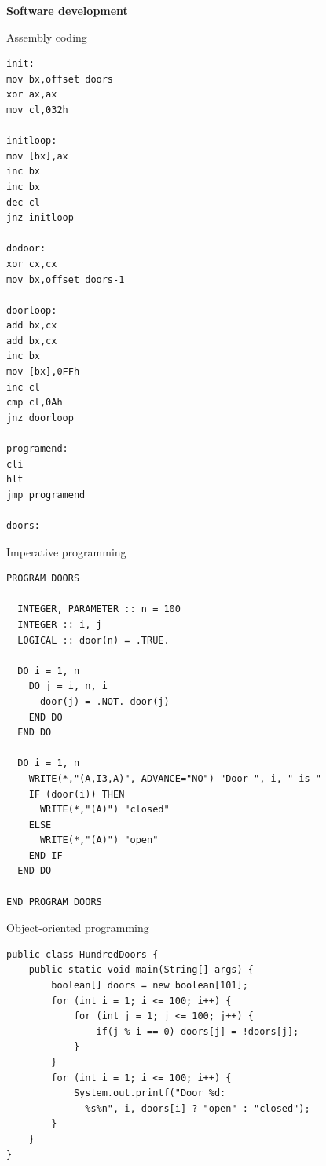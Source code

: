 \documentclass[dvips,slidetop,mathserif,red]{beamer}
\begin{document}
\begin{frame}{}
  \begin{center}
    \begin{Huge}
      \textbf{Software development}
    \end{Huge}
  \end{center}
\end{frame}

\begin{frame}[containsverbatim]{Assembly coding}
  \begin{tiny}
    \begin{verbatim}
init:
mov bx,offset doors
xor ax,ax
mov cl,032h

initloop:
mov [bx],ax
inc bx
inc bx
dec cl
jnz initloop

dodoor:
xor cx,cx
mov bx,offset doors-1

doorloop:
add bx,cx
add bx,cx
inc bx
mov [bx],0FFh
inc cl
cmp cl,0Ah
jnz doorloop

programend:
cli
hlt
jmp programend

doors:
    \end{verbatim}
  \end{tiny}
\end{frame}

\begin{frame}[containsverbatim]{Imperative programming}
  \begin{footnotesize}
    \begin{verbatim}
PROGRAM DOORS

  INTEGER, PARAMETER :: n = 100
  INTEGER :: i, j
  LOGICAL :: door(n) = .TRUE.

  DO i = 1, n
    DO j = i, n, i
      door(j) = .NOT. door(j)
    END DO
  END DO

  DO i = 1, n
    WRITE(*,"(A,I3,A)", ADVANCE="NO") "Door ", i, " is "
    IF (door(i)) THEN
      WRITE(*,"(A)") "closed"
    ELSE
      WRITE(*,"(A)") "open"
    END IF
  END DO

END PROGRAM DOORS
    \end{verbatim}
  \end{footnotesize}
\end{frame}

\begin{frame}[containsverbatim]{Object-oriented programming}
  \begin{footnotesize}
    \begin{verbatim}
public class HundredDoors {
    public static void main(String[] args) {
        boolean[] doors = new boolean[101];
        for (int i = 1; i <= 100; i++) {
            for (int j = 1; j <= 100; j++) {
                if(j % i == 0) doors[j] = !doors[j];
            }
        }
        for (int i = 1; i <= 100; i++) {
            System.out.printf("Door %d:
              %s%n", i, doors[i] ? "open" : "closed");
        }
    }
}
    \end{verbatim}
  \end{footnotesize}
\end{frame}
\end{document}
